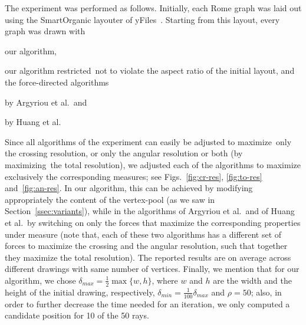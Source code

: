 \documentclass[runningheads]{llncs}
\begin{document}
The experiment was performed as follows. Initially, each Rome graph was laid out using the SmartOrganic layouter of yFiles~\cite{DBLP:books/sp/04/WieseE004}. Starting from this layout, every graph was drawn with
\begin{inparaenum}[(i)]
\item our algorithm,
\item our algorithm restricted~not to violate the aspect ratio of the initial layout, and the force-directed algorithms
\item by Argyriou et al.\ and
\item by Huang et al.
\end{inparaenum}
%
%
Since all algorithms of the experiment can easily be adjusted to maximize~only the crossing resolution, or only the angular resolution or both (by maximizing~the total resolution), we adjusted each of the algorithms to maximize exclusively the corresponding measures; see Figs.~\ref{fig:cr-res}, \ref{fig:to-res} and~\ref{fig:an-res}. In our algorithm, this can be achieved by modifying appropriately the content of the vertex-pool (as we saw in Section~\ref{ssec:variants}), while in the algorithms of Argyriou et al.\ and of Huang et al.\ by switching on only the forces that maximize the corresponding properties under measure (note that, each of these two algorithms has a different set of forces to maximize the crossing and the angular resolution, such that together they maximize the total resolution). The reported results are on average across different drawings with same number of vertices. Finally, we mention that for our algorithm, we chose $\delta_{max}=\frac{1}{2}\max\{w,h\}$, where $w$ and $h$ are the width and the height of the initial drawing, respectively, $\delta_{min}=\frac{1}{100}\delta_{max}$ and $\rho=50$; also, in order to further decrease the time needed for an iteration, we only computed a candidate position for 10 of the 50 rays. 
\end{document}
